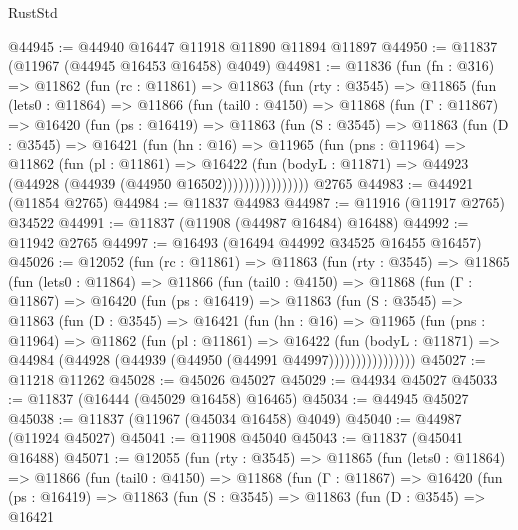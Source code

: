 \begin{lexlean}{RustStd}
\begin{coremodule}
@44945 := @44940 @16447 @11918 @11890 @11894 @11897
@44950 := @11837 (@11967 (@44945 @16453 @16458) @4049)
@44981 := @11836
    (fun (fn : @316) =>
    @11862
      (fun (rc : @11861) =>
      @11863
        (fun (rty : @3545) =>
        @11865
          (fun (lets0 : @11864) =>
          @11866
            (fun (tail0 : @4150) =>
            @11868
              (fun (Γ : @11867) =>
              @16420
                (fun (ps : @16419) =>
                @11863
                  (fun (S : @3545) =>
                  @11863
                    (fun (D : @3545) =>
                    @16421
                      (fun (hn : @16) =>
                      @11965
                        (fun (pns : @11964) =>
                        @11862
                          (fun (pl : @11861) =>
                          @16422
                            (fun (bodyL : @11871) =>
                            @44923 (@44928 (@44939 (@44950 @16502))))))))))))))))
    @2765
@44983 := @44921 (@11854 @2765)
@44984 := @11837 @44983
@44987 := @11916 (@11917 @2765) @34522
@44991 := @11837 (@11908 (@44987 @16484) @16488)
@44992 := @11942 @2765
@44997 := @16493 (@16494 @44992 @34525 @16455 @16457)
@45026 := @12052
    (fun (rc : @11861) =>
    @11863
      (fun (rty : @3545) =>
      @11865
        (fun (lets0 : @11864) =>
        @11866
          (fun (tail0 : @4150) =>
          @11868
            (fun (Γ : @11867) =>
            @16420
              (fun (ps : @16419) =>
              @11863
                (fun (S : @3545) =>
                @11863
                  (fun (D : @3545) =>
                  @16421
                    (fun (hn : @16) =>
                    @11965
                      (fun (pns : @11964) =>
                      @11862
                        (fun (pl : @11861) =>
                        @16422
                          (fun (bodyL : @11871) =>
                          @44984 (@44928 (@44939 (@44950 (@44991 @44997))))))))))))))))
@45027 := @11218 @11262
@45028 := @45026 @45027
@45029 := @44934 @45027
@45033 := @11837 (@16444 (@45029 @16458) @16465)
@45034 := @44945 @45027
@45038 := @11837 (@11967 (@45034 @16458) @4049)
@45040 := @44987 (@11924 @45027)
@45041 := @11908 @45040
@45043 := @11837 (@45041 @16488)
@45071 := @12055
    (fun (rty : @3545) =>
    @11865
      (fun (lets0 : @11864) =>
      @11866
        (fun (tail0 : @4150) =>
        @11868
          (fun (Γ : @11867) =>
          @16420
            (fun (ps : @16419) =>
            @11863
              (fun (S : @3545) =>
              @11863
                (fun (D : @3545) =>
                @16421

\end{coremodule}
\end{lexlean}
